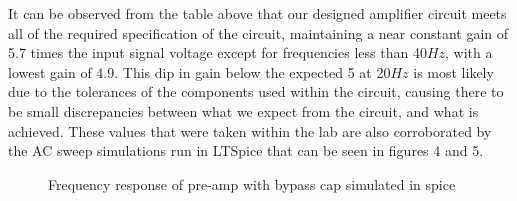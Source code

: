 \documentclass[a4paper,11pt]{article}
\begin{document}
It can be observed from the table above that our designed amplifier circuit meets all of the required specification of the circuit, maintaining a near constant gain of 5.7 times the input signal voltage except for frequencies less than 40$Hz$, with a lowest gain of 4.9. This dip in gain below the expected 5 at 20$Hz$ is most likely due to the tolerances of the components used within the circuit, causing there to be small discrepancies between what we expect from the circuit, and what is achieved. These values that were taken within the lab are also corroborated by the AC sweep simulations run in LTSpice that can be seen in figures 4 and 5. \\


\begin{figure}

\begin{center}
\end{center}
\vspace{-8pt}
\caption{Frequency response of pre-amp with bypass cap simulated in spice}
\vspace{-7cm}
\end{figure}
\end{document}

